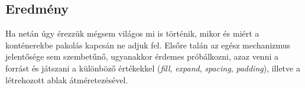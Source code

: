 \subsection{Eredmény}

Ha netán úgy érezzük mégsem világos mi is történik, mikor és miért a konténerekbe pakolás kapcsán ne adjuk fel. Elsőre talán az egész mechanizmus jelentősége sem szembetűnő, ugyanakkor érdemes próbálkozni, azaz venni a forrást és játszani a különböző értékekkel (\textit{fill}, \textit{expand}, \textit{spacing}, \textit{padding}), illetve a létrehozott ablak átméretezésével.
